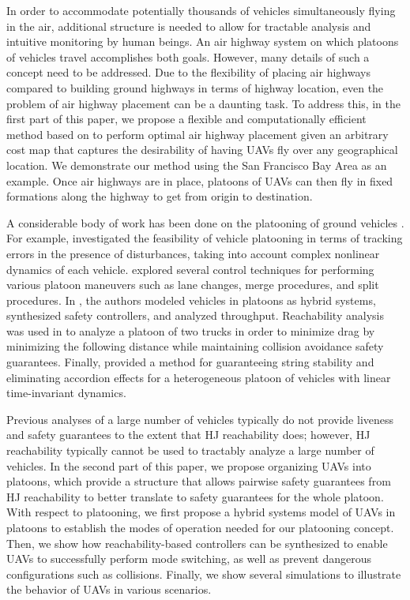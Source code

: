 In order to accommodate potentially thousands of vehicles simultaneously flying in the air, additional structure is needed to allow for tractable analysis and intuitive monitoring by human beings. An air highway system on which platoons of vehicles travel accomplishes both goals. However, many details of such a concept need to be addressed. Due to the flexibility of placing air highways compared to building ground highways in terms of highway location, even the problem of air highway placement can be a daunting task. To address this, in the first part of this paper, we propose a flexible and computationally efficient method based on \cite{Sethian96} to perform optimal air highway placement given an arbitrary cost map that captures the desirability of having UAVs fly over any geographical location. We demonstrate our method using the San Francisco Bay Area as an example. Once air highways are in place, platoons of UAVs can then fly in fixed formations along the highway to get from origin to destination. 

A considerable body of work has been done on the platooning of ground vehicles \cite{Kavathekar11}. For example, \cite{McMahon90} investigated the feasibility of vehicle platooning in terms of tracking errors in the presence of disturbances, taking into account complex nonlinear dynamics of each vehicle. \cite{Hedrick92} explored several control techniques for performing various platoon maneuvers such as lane changes, merge procedures, and split procedures. In \cite{Lygeros98}, the authors modeled vehicles in platoons as hybrid systems, synthesized safety controllers, and analyzed throughput. Reachability analysis was used in \cite{Alam11} to analyze a platoon of two trucks in order to minimize drag by minimizing the following distance while maintaining collision avoidance safety guarantees. Finally, \cite{Sabau16} provided a method for guaranteeing string stability and eliminating accordion effects for a heterogeneous platoon of vehicles with linear time-invariant dynamics.

Previous analyses of a large number of vehicles typically do not provide liveness and safety guarantees to the extent that HJ reachability does; however, HJ reachability typically cannot be used to tractably analyze a large number of vehicles. In the second part of this paper, we propose organizing UAVs into platoons, which provide a structure that allows pairwise safety guarantees from HJ reachability to better translate to safety guarantees for the whole platoon. With respect to platooning, we first propose a hybrid systems model of UAVs in platoons to establish the modes of operation needed for our platooning concept. Then, we show how reachability-based controllers can be synthesized to enable UAVs to successfully perform mode switching, as well as prevent dangerous configurations such as collisions. Finally, we show several simulations to illustrate the behavior of UAVs in various scenarios.